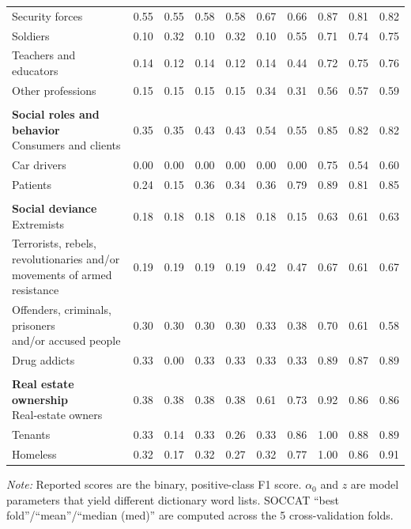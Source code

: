 \begin{table}[htb]
\begin{threeparttable}
\begin{tabular}{l c c c c c c c c c}
Security forces & 0.55 & 0.55 & 0.58 & 0.58 & 0.67 & 0.66 & 0.87 & 0.81 & 0.82 \\
Soldiers & 0.10 & 0.32 & 0.10 & 0.32 & 0.10 & 0.55 & 0.71 & 0.74 & 0.75 \\
Teachers and educators & 0.14 & 0.12 & 0.14 & 0.12 & 0.14 & 0.44 & 0.72 & 0.75 & 0.76 \\
Other professions & 0.15 & 0.15 & 0.15 & 0.15 & 0.34 & 0.31 & 0.56 & 0.57 & 0.59 \\
\rule{0pt}{5pt} &  &  &  &  &  &  &  &  &  \\
\shortstack[l]{\textbf{Social roles and behavior}\\[3pt]Consumers and clients} & 0.35 & 0.35 & 0.43 & 0.43 & 0.54 & 0.55 & 0.85 & 0.82 & 0.82 \\
Car drivers & 0.00 & 0.00 & 0.00 & 0.00 & 0.00 & 0.00 & 0.75 & 0.54 & 0.60 \\
Patients & 0.24 & 0.15 & 0.36 & 0.34 & 0.36 & 0.79 & 0.89 & 0.81 & 0.85 \\
\rule{0pt}{5pt} &  &  &  &  &  &  &  &  &  \\
\shortstack[l]{\textbf{Social deviance}\\[3pt]Extremists} & 0.18 & 0.18 & 0.18 & 0.18 & 0.18 & 0.15 & 0.63 & 0.61 & 0.63 \\
\shortstack[l]{Terrorists, rebels,\\[-3pt]revolutionaries and/or\\[-3pt]movements of armed resistance} & 0.19 & 0.19 & 0.19 & 0.19 & 0.42 & 0.47 & 0.67 & 0.61 & 0.67 \\
\shortstack[l]{Offenders, criminals, prisoners\\[-3pt]and/or accused people} & 0.30 & 0.30 & 0.30 & 0.30 & 0.33 & 0.38 & 0.70 & 0.61 & 0.58 \\
Drug addicts & 0.33 & 0.00 & 0.33 & 0.33 & 0.33 & 0.33 & 0.89 & 0.87 & 0.89 \\
\rule{0pt}{5pt} &  &  &  &  &  &  &  &  &  \\
\shortstack[l]{\textbf{Real estate ownership}\\[3pt]Real-estate owners} & 0.38 & 0.38 & 0.38 & 0.38 & 0.61 & 0.73 & 0.92 & 0.86 & 0.86 \\
Tenants & 0.33 & 0.14 & 0.33 & 0.26 & 0.33 & 0.86 & 1.00 & 0.88 & 0.89 \\
Homeless & 0.32 & 0.17 & 0.32 & 0.27 & 0.32 & 0.77 & 1.00 & 0.86 & 0.91 \\
\bottomrule
\end{tabular}
\begin{tablenotes}[flushleft]
\footnotesize
\item \textit{Note:} Reported scores are the binary, positive-class F1 score. $\alpha_0$ and $z$ are model parameters that yield different dictionary word lists. SOCCAT ``best fold''/``mean''/``median (med)'' are computed across the 5 cross-validation folds.
\end{tablenotes}
\end{threeparttable}
\end{table}